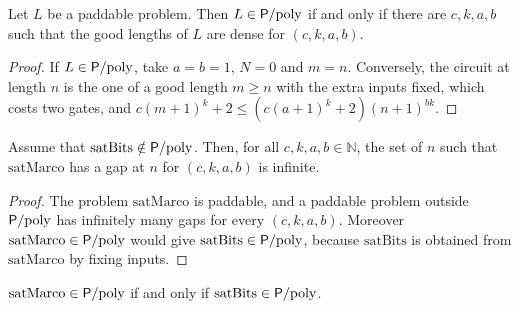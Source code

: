 \begin{theorem}
  \label{thm:infinite-psobrepoly-iff-denso}
  \leanok
  \own{}
  Let $L$ be a paddable problem. Then $L \in \mathsf{P}/\mathrm{poly}$ if and only if there are $c, k, a, b$ such that the good lengths
  of $L$ are dense for $(c, k, a, b)$.
\end{theorem}

\begin{proof}
  \leanok
  If $L \in \mathsf{P}/\mathrm{poly}$, take $a = b = 1$, $N = 0$ and $m = n$. Conversely, the circuit at length $n$ is the one of a good
  length $m \ge n$ with the extra inputs fixed, which costs two gates, and $c(m+1)^k + 2 \le (c(a+1)^k + 2)(n+1)^{bk}$.
\end{proof}

\begin{theorem}
  \label{thm:infinite-huecos-de-sat}
  \leanok
  \own{}
  Assume that $\mathrm{satBits} \notin \mathsf{P}/\mathrm{poly}$. Then, for all $c, k, a, b \in \mathbb{N}$, the set of $n$ such that
  $\mathrm{satMarco}$ has a gap at $n$ for $(c, k, a, b)$ is infinite.
\end{theorem}

\begin{proof}
  \leanok
  The problem $\mathrm{satMarco}$ is paddable, and a paddable problem outside $\mathsf{P}/\mathrm{poly}$ has infinitely many gaps for
  every $(c, k, a, b)$. Moreover $\mathrm{satMarco} \in \mathsf{P}/\mathrm{poly}$ would give $\mathrm{satBits} \in \mathsf{P}/\mathrm{poly}$, because
  $\mathrm{satBits}$ is obtained from $\mathrm{satMarco}$ by fixing inputs.
\end{proof}

\begin{theorem}
  \label{thm:infinite-satmarco-iff-satbits}
  \leanok
  \own{}
  $\mathrm{satMarco} \in \mathsf{P}/\mathrm{poly}$ if and only if $\mathrm{satBits} \in \mathsf{P}/\mathrm{poly}$.
\end{theorem}

